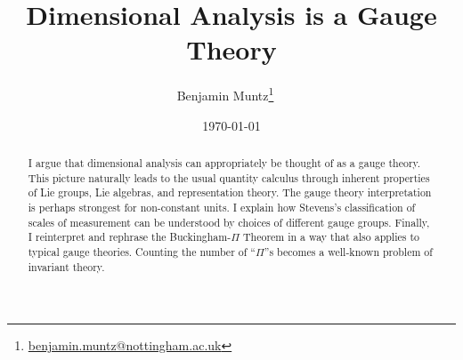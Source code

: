 \documentclass[12pt]{article}
\numberwithin{equation}{section}
\begin{document}
\title{\Large\textbf{Dimensional Analysis is a Gauge Theory}}
\author[]{Benjamin Muntz\footnote{\href{mailto:benjamin.muntz@nottingham.ac.uk}{benjamin.muntz@nottingham.ac.uk}}\ \ }
\setlength{\affilsep}{\baselineskip}
\renewcommand\Affilfont{\itshape\small}

\date{\today}
\maketitle
\thispagestyle{empty}

\begin{abstract}
\noindent I argue that dimensional analysis can appropriately be thought of as a gauge theory. This picture naturally leads to the usual quantity calculus through inherent properties of Lie groups, Lie algebras, and representation theory. The gauge theory interpretation is perhaps strongest for non-constant units. I explain how Stevens's classification of scales of measurement can be understood by choices of different gauge groups. Finally, I reinterpret and rephrase the Buckingham-$\Pi$ Theorem in a way that also applies to typical gauge theories. Counting the number of ``$\Pi$''s becomes a well-known problem of invariant theory.
\end{abstract}



\onehalfspacing



\end{document}
